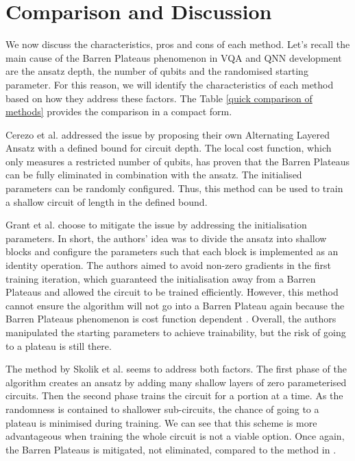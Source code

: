 \section{Comparison and Discussion}
We now discuss the characteristics, pros and cons of each method.
Let's recall the main cause of the Barren Plateaus phenomenon in VQA and QNN development are the ansatz depth, the number of qubits and the randomised starting parameter.
For this reason, we will identify the characteristics of each method based on how they address these factors.
The Table \ref{quick comparison of methods} provides the comparison in a compact form.

Cerezo et al. \cite{cerezoCostFunctionDependent2021} addressed the issue by proposing their own Alternating Layered Ansatz with a defined bound for circuit depth.
The local cost function, which only measures a restricted number of qubits, has proven that the Barren Plateaus can be fully eliminated in combination with the ansatz. 
The initialised parameters can be randomly configured.
Thus, this method can be used to train a shallow circuit of length in the defined bound. 

Grant et al. \cite{grantInitializationStrategyAddressing2019} choose to mitigate the issue by addressing the initialisation parameters. 
In short, the authors' idea was to divide the ansatz into shallow blocks and configure the parameters such that each block is implemented as an identity operation.
The authors aimed to avoid non-zero gradients in the first training iteration, which guaranteed the initialisation away from a Barren Plateaus and allowed the circuit to be trained efficiently.
However, this method cannot ensure the algorithm will not go into a Barren Plateau again because the Barren Plateaus phenomenon is cost function dependent \cite{cerezoCostFunctionDependent2021}.
Overall, the authors manipulated the starting parameters to achieve trainability, but the risk of going to a plateau is still there.

The method by Skolik et al. \cite{skolikLayerwiseLearningQuantum2021} seems to address both factors.
The first phase of the algorithm creates an ansatz by adding many shallow layers of zero parameterised circuits. 
Then the second phase trains the circuit for a portion at a time.
As the randomness is contained to shallower sub-circuits, the chance of going to a plateau is minimised during training.
We can see that this scheme is more advantageous when training the whole circuit is not a viable option. 
Once again, the Barren Plateaus is mitigated, not eliminated, compared to the method in \cite{cerezoCostFunctionDependent2021}.

